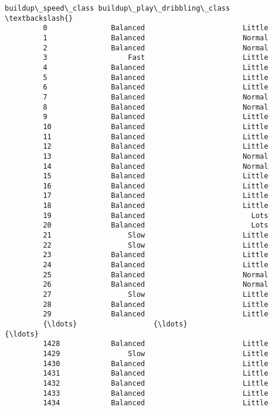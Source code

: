 \documentclass[11pt]{article}
\begin{document}
\begin{Verbatim}[commandchars=\\\{\}]
              buildup\_speed\_class buildup\_play\_dribbling\_class  \textbackslash{}
         0               Balanced                       Little   
         1               Balanced                       Normal   
         2               Balanced                       Normal   
         3                   Fast                       Little   
         4               Balanced                       Little   
         5               Balanced                       Little   
         6               Balanced                       Little   
         7               Balanced                       Normal   
         8               Balanced                       Normal   
         9               Balanced                       Little   
         10              Balanced                       Little   
         11              Balanced                       Little   
         12              Balanced                       Little   
         13              Balanced                       Normal   
         14              Balanced                       Normal   
         15              Balanced                       Little   
         16              Balanced                       Little   
         17              Balanced                       Little   
         18              Balanced                       Little   
         19              Balanced                         Lots   
         20              Balanced                         Lots   
         21                  Slow                       Little   
         22                  Slow                       Little   
         23              Balanced                       Little   
         24              Balanced                       Little   
         25              Balanced                       Normal   
         26              Balanced                       Normal   
         27                  Slow                       Little   
         28              Balanced                       Little   
         29              Balanced                       Little   
         {\ldots}                  {\ldots}                          {\ldots}   
         1428            Balanced                       Little   
         1429                Slow                       Little   
         1430            Balanced                       Little   
         1431            Balanced                       Little   
         1432            Balanced                       Little   
         1433            Balanced                       Little   
         1434            Balanced                       Little   

\end{Verbatim}
\end{document}
